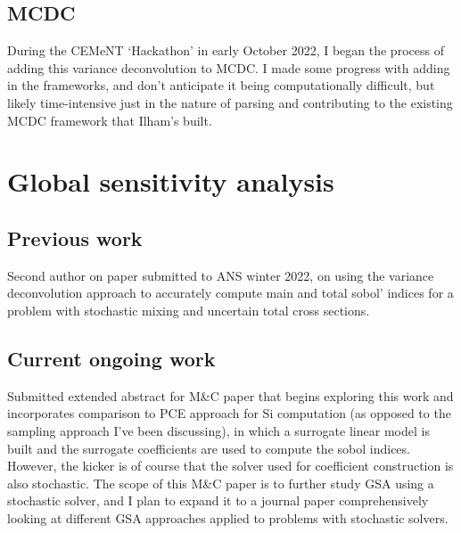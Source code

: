 \subsection{MCDC}
During the CEMeNT `Hackathon' in early October 2022, I began the process of adding this variance deconvolution to MCDC. I made some progress with adding in the frameworks, and don't anticipate it being computationally difficult, but likely time-intensive just in the nature of parsing and contributing to the existing MCDC framework that Ilham's built. 



\section{Global sensitivity analysis}
\subsection{Previous work}
Second author on paper submitted to ANS winter 2022, on using the variance deconvolution approach to accurately compute main and total sobol' indices for a problem with stochastic mixing and uncertain total cross sections.
\subsection{Current ongoing work}
Submitted extended abstract for M\&C paper that begins exploring this work and incorporates comparison to PCE approach for Si computation (as opposed to the sampling approach I've been discussing), in which a surrogate linear model is built and the surrogate coefficients are used to compute the sobol indices. However, the kicker is of course that the solver used for coefficient construction is also stochastic. The scope of this M\&C paper is to further study GSA using a stochastic solver, and I plan to expand it to a journal paper comprehensively looking at different GSA approaches applied to problems with stochastic solvers.

